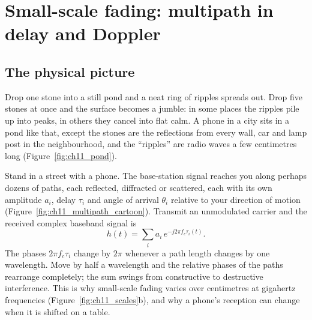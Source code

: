 \section{Small-scale fading: multipath in delay and Doppler}
\label{sec:ch11:multipath}

\subsection{The physical picture}

Drop one stone into a still pond and a neat ring of ripples spreads out. Drop five stones at once
and the surface becomes a jumble: in some places the ripples pile up into peaks, in others they
cancel into flat calm. A phone in a city sits in a pond like that, except the stones are the
reflections from every wall, car and lamp post in the neighbourhood, and the ``ripples'' are
radio waves a few centimetres long (Figure~\ref{fig:ch11_pond}).


Stand in a street with a phone. The base-station signal reaches you along perhaps dozens of
paths, each reflected, diffracted or scattered, each with its own amplitude $a_i$, delay
$\tau_i$ and angle of arrival $\theta_i$ relative to your direction of motion
(Figure~\ref{fig:ch11_multipath_cartoon}). Transmit an unmodulated carrier and the received complex
baseband signal is
\begin{equation}
h(t)=\sum_i a_i\,e^{-j2\pi f_c\tau_i(t)}.
\end{equation}
The phases $2\pi f_c\tau_i$ change by $2\pi$ whenever a path length changes by one wavelength.
Move by half a wavelength and the relative phases of the paths rearrange completely; the sum
swings from constructive to destructive interference. This is why small-scale fading varies over
centimetres at gigahertz frequencies (Figure~\ref{fig:ch11_scales}b), and why a phone's
reception can change when it is shifted on a table.



